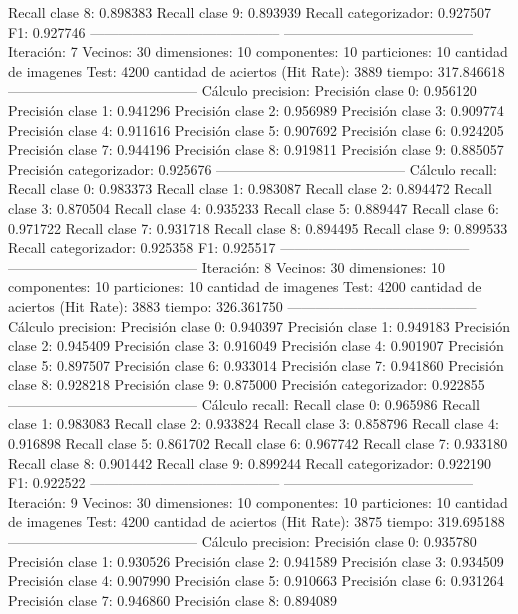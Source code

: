 Recall clase 8: 0.898383
Recall clase 9: 0.893939
Recall categorizador: 0.927507
F1: 0.927746
-----------------------------------------
-----------------------------------------
Iteración: 7
Vecinos: 30
dimensiones: 10
componentes: 10
particiones: 10
cantidad de imagenes Test: 4200
cantidad de aciertos (Hit Rate): 3889
tiempo: 317.846618
-----------------------------------------
Cálculo precision: 
Precisión clase 0: 0.956120
Precisión clase 1: 0.941296
Precisión clase 2: 0.956989
Precisión clase 3: 0.909774
Precisión clase 4: 0.911616
Precisión clase 5: 0.907692
Precisión clase 6: 0.924205
Precisión clase 7: 0.944196
Precisión clase 8: 0.919811
Precisión clase 9: 0.885057
Precisión categorizador: 0.925676
-----------------------------------------
Cálculo recall: 
Recall clase 0: 0.983373
Recall clase 1: 0.983087
Recall clase 2: 0.894472
Recall clase 3: 0.870504
Recall clase 4: 0.935233
Recall clase 5: 0.889447
Recall clase 6: 0.971722
Recall clase 7: 0.931718
Recall clase 8: 0.894495
Recall clase 9: 0.899533
Recall categorizador: 0.925358
F1: 0.925517
-----------------------------------------
-----------------------------------------
Iteración: 8
Vecinos: 30
dimensiones: 10
componentes: 10
particiones: 10
cantidad de imagenes Test: 4200
cantidad de aciertos (Hit Rate): 3883
tiempo: 326.361750
-----------------------------------------
Cálculo precision: 
Precisión clase 0: 0.940397
Precisión clase 1: 0.949183
Precisión clase 2: 0.945409
Precisión clase 3: 0.916049
Precisión clase 4: 0.901907
Precisión clase 5: 0.897507
Precisión clase 6: 0.933014
Precisión clase 7: 0.941860
Precisión clase 8: 0.928218
Precisión clase 9: 0.875000
Precisión categorizador: 0.922855
-----------------------------------------
Cálculo recall: 
Recall clase 0: 0.965986
Recall clase 1: 0.983083
Recall clase 2: 0.933824
Recall clase 3: 0.858796
Recall clase 4: 0.916898
Recall clase 5: 0.861702
Recall clase 6: 0.967742
Recall clase 7: 0.933180
Recall clase 8: 0.901442
Recall clase 9: 0.899244
Recall categorizador: 0.922190
F1: 0.922522
-----------------------------------------
-----------------------------------------
Iteración: 9
Vecinos: 30
dimensiones: 10
componentes: 10
particiones: 10
cantidad de imagenes Test: 4200
cantidad de aciertos (Hit Rate): 3875
tiempo: 319.695188
-----------------------------------------
Cálculo precision: 
Precisión clase 0: 0.935780
Precisión clase 1: 0.930526
Precisión clase 2: 0.941589
Precisión clase 3: 0.934509
Precisión clase 4: 0.907990
Precisión clase 5: 0.910663
Precisión clase 6: 0.931264
Precisión clase 7: 0.946860
Precisión clase 8: 0.894089

